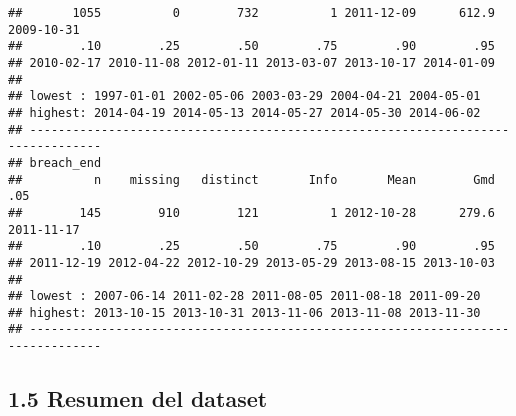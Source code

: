 \documentclass[
]{article}
\begin{document}
\begin{verbatim}
##       1055          0        732          1 2011-12-09      612.9 2009-10-31 
##        .10        .25        .50        .75        .90        .95 
## 2010-02-17 2010-11-08 2012-01-11 2013-03-07 2013-10-17 2014-01-09 
## 
## lowest : 1997-01-01 2002-05-06 2003-03-29 2004-04-21 2004-05-01
## highest: 2014-04-19 2014-05-13 2014-05-27 2014-05-30 2014-06-02
## --------------------------------------------------------------------------------
## breach_end 
##          n    missing   distinct       Info       Mean        Gmd        .05 
##        145        910        121          1 2012-10-28      279.6 2011-11-17 
##        .10        .25        .50        .75        .90        .95 
## 2011-12-19 2012-04-22 2012-10-29 2013-05-29 2013-08-15 2013-10-03 
## 
## lowest : 2007-06-14 2011-02-28 2011-08-05 2011-08-18 2011-09-20
## highest: 2013-10-15 2013-10-31 2013-11-06 2013-11-08 2013-11-30
## --------------------------------------------------------------------------------
\end{verbatim}

\hypertarget{resumen-del-dataset}{%
\subsection{1.5 Resumen del dataset}\label{resumen-del-dataset}}
\end{document}
